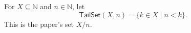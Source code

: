 \begin{definition}
For $X\subseteq\mathbb N$ and $n\in\mathbb N$, let
\[
\mathsf{TailSet}(X,n)=\{k\in X\mid n<k\}.
\]
This is the paper's set $X/n$.
\end{definition}
